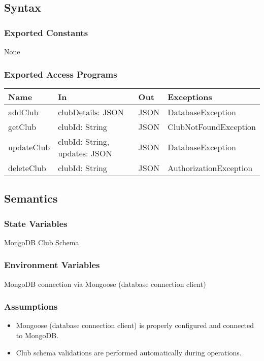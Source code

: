 \documentclass[12pt, titlepage]{article}
\begin{document}
\subsection{Syntax}

\subsubsection{Exported Constants}
None

\subsubsection{Exported Access Programs}

\begin{center}
\begin{tabular}{p{2cm} p{4cm} p{2cm} p{4cm}}
\hline
\textbf{Name} & \textbf{In} & \textbf{Out} & \textbf{Exceptions} \\
\hline
addClub & clubDetails: JSON & JSON & DatabaseException \\
getClub & clubId: String & JSON & ClubNotFoundException \\
updateClub & clubId: String, updates: JSON & JSON & DatabaseException \\
deleteClub & clubId: String & JSON & AuthorizationException \\
\hline
\end{tabular}
\end{center}

\subsection{Semantics}

\subsubsection{State Variables}
MongoDB Club Schema

\subsubsection{Environment Variables}
MongoDB connection via Mongoose (database connection client)

\subsubsection{Assumptions}
\begin{itemize}
  \item Mongoose (database connection client) is properly configured and connected to MongoDB.
  \item Club schema validations are performed automatically during operations.
\end{itemize}
\end{document}
